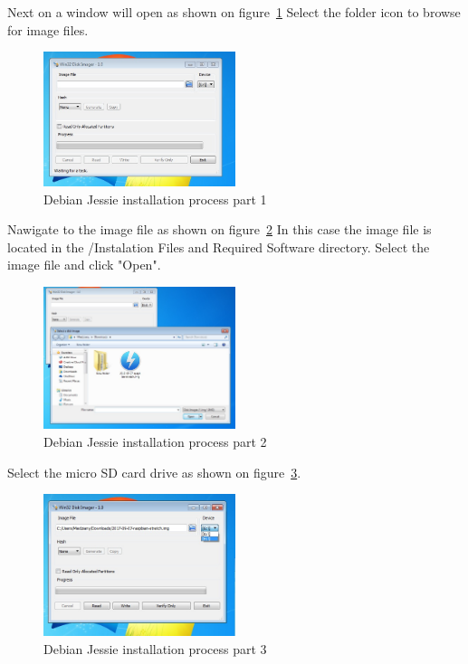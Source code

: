 \documentclass[12pt,]{article}
\begin{document}
Next on a window will open as shown on figure~\ref{fig:7} Select the folder icon to browse for image files.
\begin{figure}[H]
  	\begin{center}
    	\includegraphics[width=0.5\textwidth]{Win32_7}
  	\end{center}
  	\caption{Debian Jessie installation process part 1}
	\label{fig:7}
\end{figure}
Nawigate to the image file as shown on figure~\ref{fig:8} In this case the image file is located in the /Instalation Files and Required Software directory. Select the image file and click "Open".
\begin{figure}[H]
  	\begin{center}
    	\includegraphics[width=0.5\textwidth]{Win32_8}
  	\end{center}
  	\caption{Debian Jessie installation process part 2}
	\label{fig:8}
\end{figure}
Select the micro SD card drive as shown on figure~\ref{fig:9}.
\begin{figure}[H]
  	\begin{center}
    	\includegraphics[width=0.5\textwidth]{Win32_9}
  	\end{center}
  	\caption{Debian Jessie installation process part 3}
	\label{fig:9}
\end{figure}
\end{document}
